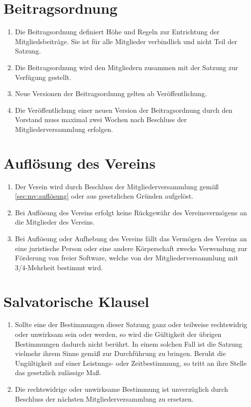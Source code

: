 \documentclass[12pt,paper=a4,ngerman]{scrreprt}
\begin{document}
	\section {Beitragsordnung}
	\begin{enumerate}
	    \item
	        Die Beitragsordnung definiert Höhe und Regeln zur Entrichtung der Mitgliedsbeiträge. Sie ist für alle Mitglieder verbindlich und nicht Teil der Satzung.
	    \item
	        Die Beitragsordnung wird den Mitgliedern zusammen mit der Satzung zur Verfügung gestellt.
		\item
		    Neue Versionen der Beitragsordnung gelten ab Veröffentlichung.
	    \item
	        Die Veröffentlichung einer neuen Version der Beitragsordnung durch den Vorstand muss maximal zwei Wochen nach Beschluss der Mitgliederversammlung erfolgen.
	\end{enumerate}
	
	\section{Auflösung des Vereins}
    \begin{enumerate}
        \item 
            Der Verein wird durch Beschluss der Mitgliederversammlung gemäß \ref{sec:mv:auflösung} oder aus gesetzlichen Gründen aufgelöst.
        \item
            Bei Auflösung des Vereins erfolgt keine Rückgewähr des Vereinsvermögens an die Mitglieder des Vereins.
        \item
            Bei Auflösung oder Aufhebung des Vereins fällt das Vermögen des Vereins an eine juristische Person oder eine andere Körperschaft zwecks Verwendung zur Förderung von freier Software, welche von der Mitgliederversammlung mit 3/4-Mehrheit bestimmt wird.
    \end{enumerate}
	
	\section{Salvatorische Klausel}
    \begin{enumerate}
        \item
            Sollte eine der Bestimmungen dieser Satzung ganz oder teilweise rechtswidrig oder unwirksam sein oder werden, so wird die Gültigkeit der übrigen Bestimmungen dadurch nicht berührt. In einem solchen Fall ist die Satzung vielmehr ihrem Sinne gemäß zur Durchführung zu bringen. Beruht die Ungültigkeit auf einer Leistungs- oder Zeitbestimmung, so tritt an ihre Stelle das gesetzlich zulässige Maß.
        \item
            Die rechtswidrige oder unwirksame Bestimmung ist unverzüglich durch Beschluss der nächsten Mitgliederversammlung zu ersetzen.
    \end{enumerate}
\end{document}
